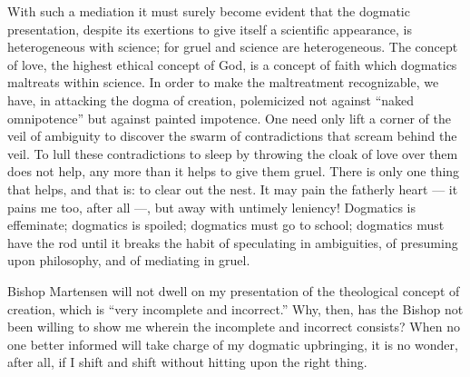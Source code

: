 \documentclass[12pt]{book}
\begin{document}
With such a mediation it must surely become evident that the dogmatic presentation, despite its exertions to give itself a scientific appearance, is heterogeneous with science; for gruel and science are heterogeneous. The concept of love, the highest ethical concept of God, is a concept of faith which dogmatics maltreats within science. In order to make the maltreatment recognizable, we have, in attacking the dogma of creation, polemicized not against ``naked omnipotence'' but against painted impotence. One need only lift a corner of the veil of ambiguity to discover the swarm of contradictions that scream behind the veil. To lull these contradictions to sleep by throwing the cloak of love over them does not help, any more than it helps to give them gruel. There is only one thing that helps, and that is: to clear out the nest. It may pain the fatherly heart --- it pains me too, after all ---, but away with untimely leniency! Dogmatics is effeminate; dogmatics is spoiled; dogmatics must go to school; dogmatics must have the rod until it breaks the habit of speculating in ambiguities, of presuming upon philosophy, and of mediating in gruel.

Bishop Martensen will not dwell on my presentation of the theological concept of creation, which is ``very incomplete and incorrect.'' Why, then, has the Bishop not been willing to show me wherein the incomplete and incorrect consists? When no one better informed will take charge of my dogmatic upbringing, it is no wonder, after all, if I shift and shift without hitting upon the right thing.
\end{document}
